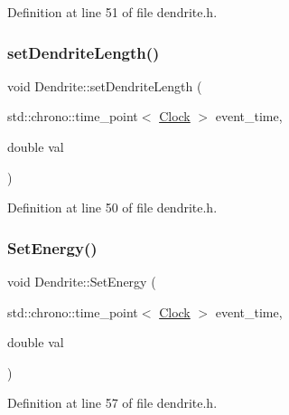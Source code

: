 Definition at line 51 of file dendrite.\+h.

\mbox{\label{class_dendrite_a9bc84d369ac487b095ed1641f89469d2}} 
\subsubsection{\texorpdfstring{set\+Dendrite\+Length()}{setDendriteLength()}}
{\footnotesize\ttfamily void Dendrite\+::set\+Dendrite\+Length (\begin{DoxyParamCaption}\item[{std\+::chrono\+::time\+\_\+point$<$ \hyperlink{universe_8h_a0ef8d951d1ca5ab3cfaf7ab4c7a6fd80}{Clock} $>$}]{event\+\_\+time,  }\item[{double}]{val }\end{DoxyParamCaption})\hspace{0.3cm}{\ttfamily [inline]}}



Definition at line 50 of file dendrite.\+h.

\mbox{\label{class_dendrite_ad341dcd42c9d5d486be1e8268d8bca27}} 
\subsubsection{\texorpdfstring{Set\+Energy()}{SetEnergy()}}
{\footnotesize\ttfamily void Dendrite\+::\+Set\+Energy (\begin{DoxyParamCaption}\item[{std\+::chrono\+::time\+\_\+point$<$ \hyperlink{universe_8h_a0ef8d951d1ca5ab3cfaf7ab4c7a6fd80}{Clock} $>$}]{event\+\_\+time,  }\item[{double}]{val }\end{DoxyParamCaption})\hspace{0.3cm}{\ttfamily [inline]}}



Definition at line 57 of file dendrite.\+h.

